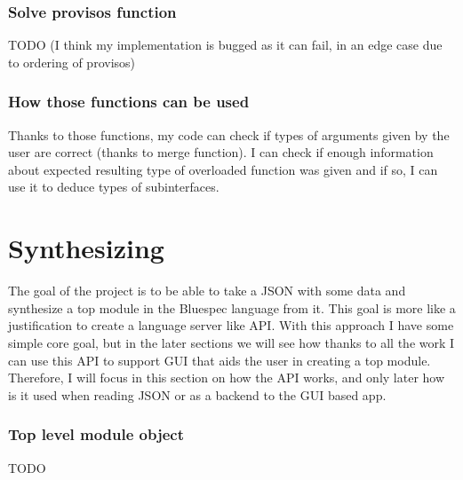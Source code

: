 \documentclass[14pt]{report}
\begin{document}
\subsubsection*{Solve provisos function}
TODO (I think my implementation is bugged as it can fail, in an edge case due to ordering of provisos)

\subsubsection*{How those functions can be used}
Thanks to those functions, my code can check if types of arguments given by the user are correct (thanks to merge function). I can check if enough information about expected resulting type of overloaded function was given and if so, I can use it to deduce types of subinterfaces.

\section{Synthesizing}
The goal of the project is to be able to take a JSON with some data and synthesize a top module in the Bluespec language from it. This goal is more like a justification to create a language server like API. With this approach I have some simple core goal, but in the later sections we will see how thanks to all the work I can use this API to support GUI that aids the user in creating a top module. Therefore, I will focus in this section on how the API works, and only later how is it used when reading JSON or as a backend to the GUI based app.

\subsubsection*{Top level module object}
TODO
\end{document}
